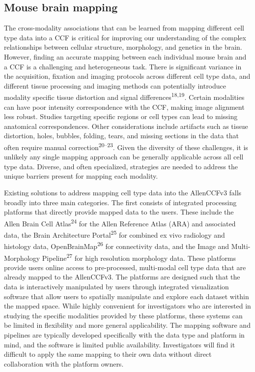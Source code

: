 \documentclass[
  12pt,
]{article}
\begin{document}
\subsection{Mouse brain mapping}\label{mouse-brain-mapping}

The cross-modality associations that can be learned from mapping
different cell type data into a CCF is critical for improving our
understanding of the complex relationships between cellular structure,
morphology, and genetics in the brain. However, finding an accurate
mapping between each individual mouse brain and a CCF is a challenging
and heterogeneous task. There is significant variance in the
acquisition, fixation and imaging protocols across different cell type
data, and different tissue processing and imaging methods can
potentially introduce modality specific tissue distortion and signal
differences\textsuperscript{18,19}. Certain modalities can have poor
intensity correspondence with the CCF, making image alignment less
robust. Studies targeting specific regions or cell types can lead to
missing anatomical correspondences. Other considerations include
artifacts such as tissue distortion, holes, bubbles, folding, tears, and
missing sections in the data that often require manual
correction\textsuperscript{20--23}. Given the diversity of these
challenges, it is unlikely any single mapping approach can be generally
applicable across all cell type data. Diverse, and often specialized,
strategies are needed to address the unique barriers present for mapping
each modality.

Existing solutions to address mapping cell type data into the AllenCCFv3
falls broadly into three main categories. The first consists of
integrated processing platforms that directly provide mapped data to the
users. These include the Allen Brain Cell Atlas\textsuperscript{24} for
the Allen Reference Atlas (ARA) and associated data, the Brain
Architecture Portal\textsuperscript{25} for combined ex vivo radiology
and histology data, OpenBrainMap\textsuperscript{26} for connectivity
data, and the Image and Multi-Morphology Pipeline\textsuperscript{27}
for high resolution morphology data. These platforms provide users
online access to pre-processed, multi-modal cell type data that are
already mapped to the AllenCCFv3. The platforms are designed such that
the data is interactively manipulated by users through integrated
visualization software that allow users to spatially manipulate and
explore each dataset within the mapped space. While highly convenient
for investigators who are interested in studying the specific modalities
provided by these platforms, these systems can be limited in flexibility
and more general applicability. The mapping software and pipelines are
typically developed specifically with the data type and platform in
mind, and the software is limited public availability. Investigators
will find it difficult to apply the same mapping to their own data
without direct collaboration with the platform owners.
\end{document}
